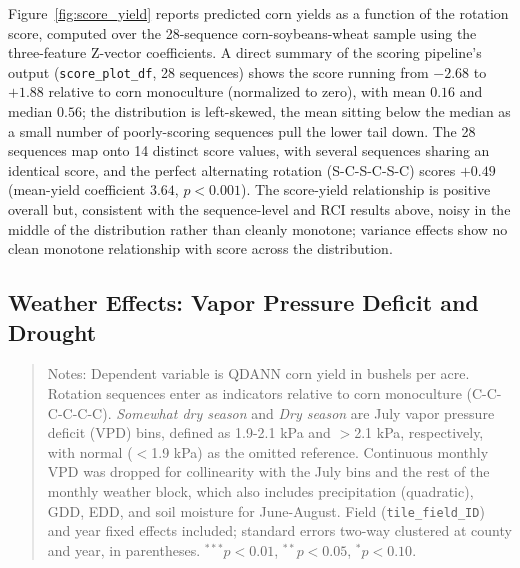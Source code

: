 \documentclass[12pt,letterpaper]{article}
\theoremstyle{remark}
\theoremstyle{remark}
\theoremstyle{plain}
\theoremstyle{definition}
\begin{document}
Figure~\ref{fig:score_yield} reports predicted corn yields as a function of the rotation score, computed over the 28-sequence corn-soybeans-wheat sample using the three-feature Z-vector coefficients. A direct summary of the scoring pipeline's output (\texttt{score\_plot\_df}, 28 sequences) shows the score running from $-2.68$ to $+1.88$ relative to corn monoculture (normalized to zero), with mean $0.16$ and median $0.56$; the distribution is left-skewed, the mean sitting below the median as a small number of poorly-scoring sequences pull the lower tail down. The 28 sequences map onto 14 distinct score values, with several sequences sharing an identical score, and the perfect alternating rotation (S-C-S-C-S-C) scores $+0.49$ (mean-yield coefficient $3.64$, $p<0.001$). The score-yield relationship is positive overall but, consistent with the sequence-level and RCI results above, noisy in the middle of the distribution rather than cleanly monotone; variance effects show no clean monotone relationship with score across the distribution.

\subsection{\label{subsec:vpd_effects}Weather Effects: Vapor Pressure Deficit and Drought}


\begin{quote}
\small
Notes: Dependent variable is QDANN corn yield in bushels per acre. Rotation
sequences enter as indicators relative to corn monoculture (C-C-C-C-C-C).
\emph{Somewhat dry season} and \emph{Dry season} are July vapor pressure deficit
(VPD) bins, defined as 1.9-2.1 kPa and $>$2.1 kPa, respectively, with normal
($<$1.9 kPa) as the omitted reference. Continuous monthly VPD was dropped for
collinearity with the July bins and the rest of the monthly weather block, which
also includes precipitation (quadratic), GDD, EDD, and soil moisture for
June-August. Field
(\texttt{tile\_field\_ID}) and year fixed effects included; standard errors
two-way clustered at county and year, in parentheses. $^{***}p<0.01$,
$^{**}p<0.05$, $^{*}p<0.10$.
\end{quote}
\end{document}
